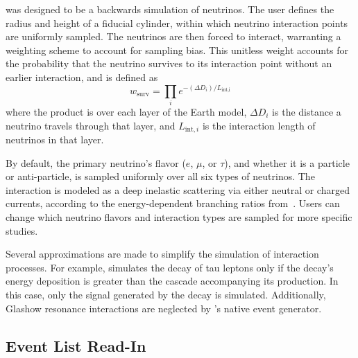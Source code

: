             \arasim{} was designed to be a backwards simulation of neutrinos.
            The user defines the radius and height of a fiducial cylinder, within 
            which neutrino interaction points are uniformly sampled.
            The neutrinos are then forced to interact, 
            warranting a weighting scheme to account for sampling bias.
            This unitless weight accounts for the probability that the neutrino 
            survives to its interaction point without an earlier interaction, and is defined as 
            \begin{equation}
              w_{\text{surv}} = \prod_i e^{-(\Delta D_i) / L_{\text{int,i}}}
              \label{eq:arasim_survival_weight}
            \end{equation}
            where the product is over each layer of the Earth model, $\Delta D_i$ is the distance a neutrino travels through that layer, and $L_{\text{int},i}$ is the interaction length of neutrinos in that layer.

            By default, the primary neutrino's flavor ($e$, $\mu$, or $\tau$), and whether it is a particle or anti-particle, is sampled uniformly over all six types of neutrinos.
            The interaction is modeled as a deep inelastic scattering
            via either neutral or charged currents, according to the energy-dependent branching ratios
            from~\citep{birefringence}.
            Users can change which neutrino flavors and interaction types are sampled for more specific studies.
            
            Several approximations are made to simplify the simulation of interaction processes.
            For example, \arasim{} simulates the decay of tau leptons only if the decay's energy deposition is greater than the cascade accompanying its production.
            In this case, only the signal generated by the decay is simulated.
            Additionally, Glashow resonance interactions are neglected by \arasim{}'s native event generator.
    
        \subsection{Event List Read-In\label{sec:eventlist}}

